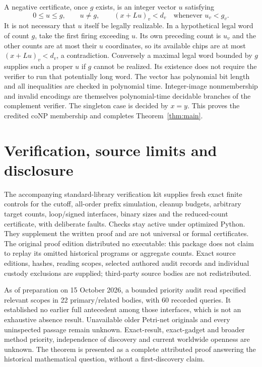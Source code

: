 \documentclass[11pt]{article}
\begin{document}
A negative certificate, once $g$ exists, is an integer vector $u$
satisfying
\begin{equation}\label{eq:certificate}
 0\leq u\leq g,\qquad u\ne g,\qquad
 (x+Lu)_v<d_v\quad\text{whenever }u_v<g_v.
\end{equation}
It is not necessary that $u$ itself be legally realizable. In a
hypothetical legal word of count $g$, take the first firing exceeding
$u$. Its own preceding count is $u_v$ and the other counts are at
most their $u$ coordinates, so its available chips are at most
$(x+Lu)_v<d_v$, a contradiction. Conversely a maximal legal word
bounded by $g$ supplies such a proper $u$ if $g$ cannot be realized.
Its existence does not require the verifier to run that potentially
long word. The vector has polynomial bit length and all inequalities
are checked in polynomial time. Integer-image nonmembership and
invalid encodings are themselves polynomial-time decidable branches
of the complement verifier. The singleton case is decided by $x=y$.
This proves the credited coNP membership and completes
Theorem~\ref{thm:main}.

\section{Verification, source limits and disclosure}
The accompanying standard-library verification kit supplies fresh
exact finite controls for the cutoff, all-order prefix simulation,
cleanup budgets, arbitrary target counts, loop/signed interfaces,
binary sizes and the reduced-count certificate, with deliberate
faults. Checks stay active under optimized Python. They supplement
the written proof and are not universal or formal certificates.
The original proof edition distributed no executable: this package
does not claim to replay its omitted historical programs or aggregate
counts. Exact source editions, hashes, reading scopes, selected
authored audit records and individual custody exclusions are supplied;
third-party source bodies are not redistributed.

As of preparation on 15 October 2026, a bounded priority audit read
specified relevant scopes in 22 primary/related bodies, with 60
recorded queries. It established no earlier full antecedent among
those interfaces, which is not an exhaustive absence result.
Unavailable older Petri-net originals and every uninspected passage
remain unknown. Exact-result, exact-gadget and broader method priority,
independence of discovery and current worldwide openness are unknown.
The theorem is presented as a complete attributed proof answering the
historical mathematical question, without a first-discovery claim.
\end{document}
